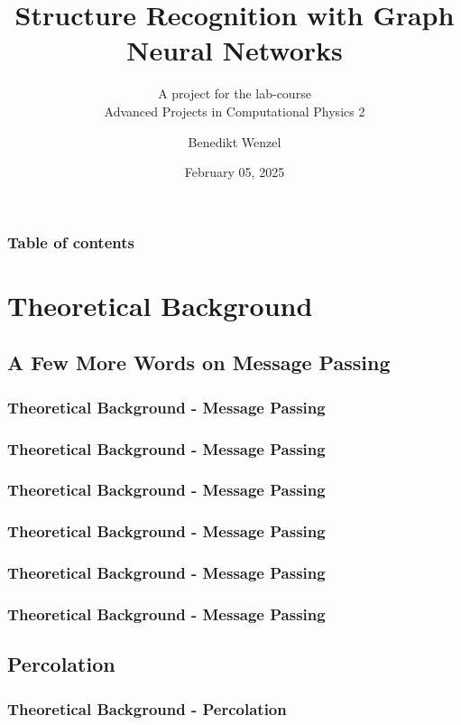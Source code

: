 \documentclass{beamer}
\title{Structure Recognition with Graph Neural Networks}
\subtitle{A project for the lab-course \\Advanced Projects in Computational Physics 2 }
\date{February 05, 2025}
\author{Benedikt Wenzel}
\begin{document}
\begin{frame}[plain]
\hspace*{-0.7cm}
\begin{minipage}{\textwidth}
    \titlepage    
\end{minipage}
\end{frame}

\begin{frame}
    \frametitle{Table of contents}
    \tableofcontents
\end{frame}

\section{Theoretical Background}
\subsection{A Few More Words on Message Passing}
\begin{frame}
    \frametitle{Theoretical Background - Message Passing}
    
\end{frame}
\begin{frame}
    \frametitle{Theoretical Background - Message Passing}
    
\end{frame}
\begin{frame}
    \frametitle{Theoretical Background - Message Passing}
    
\end{frame}
\begin{frame}
    \frametitle{Theoretical Background - Message Passing}
    
\end{frame}
\begin{frame}
    \frametitle{Theoretical Background - Message Passing}
    
\end{frame}
\begin{frame}
    \frametitle{Theoretical Background - Message Passing}
    
\end{frame}

\subsection{Percolation}
\begin{frame}
    \frametitle{Theoretical Background - Percolation}
    
\end{frame}
\end{document}
